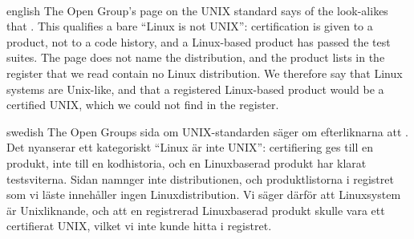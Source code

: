\paragraph{} %
\begin{onlyin}{english} %
The Open Group's page on the UNIX standard says of the look-alikes that
.
This qualifies a bare \enquote{Linux is not UNIX}: certification is given
to a product, not to a code history, and a Linux-based product has passed
the test suites.
The page does not name the distribution, and the product lists in the
register that we read contain no Linux distribution.
We therefore say that Linux systems are Unix-like, and that a registered
Linux-based product would be a certified UNIX, which we could not find
in the register.
\end{onlyin}
\begin{onlyin}{swedish}
The Open Groups sida om UNIX-standarden säger om efterliknarna att
.
Det nyanserar ett kategoriskt \enquote{Linux är inte UNIX}: certifiering
ges till en produkt, inte till en kodhistoria, och en Linuxbaserad
produkt har klarat testsviterna.
Sidan namnger inte distributionen, och produktlistorna i registret som
vi läste innehåller ingen Linuxdistribution.
Vi säger därför att Linuxsystem är Unixliknande, och att en registrerad
Linuxbaserad produkt skulle vara ett certifierat UNIX, vilket vi inte
kunde hitta i registret.
\end{onlyin}

